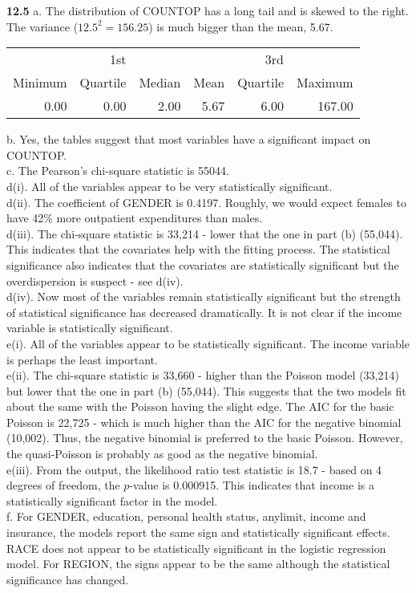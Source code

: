 \textbf{12.5} a. The distribution of COUNTOP has a long tail and is
skewed to the right. The variance ($12.5^2 = 156.25$) is much bigger
than the mean, 5.67.\\
\begin{center}\begin{tabular}{rrrrrr} \hline
   &1st &  &  &3rd  &  \\
  Minimum & Quartile & Median &   Mean &Quartile &  Maximum\\\hline
   0.00   & 0.00 &   2.00 &   5.67 &   6.00 & 167.00\\
\hline
\end{tabular}\end{center}
b. Yes, the tables suggest that most variables have a significant
impact on COUNTOP. \\
c. The Pearson's chi-square statistic is 55044. \\
d(i). All of the variables appear to be very statistically
significant. \\
d(ii). The coefficient of GENDER is  0.4197. Roughly, we would
expect females to have 42\% more outpatient expenditures than males.
\\
d(iii). The chi-square statistic is 33,214 - lower that the one in
part (b) (55,044). This indicates that the covariates help with the
fitting process. The statistical significance also indicates that
the covariates are statistically significant but the overdispersion
is suspect - see d(iv). \\
d(iv). Now most of the variables remain statistically significant
but the strength of statistical significance has decreased
dramatically. It is not clear if the income variable is
statistically significant. \\
e(i). All of the variables appear to be statistically significant.
The income variable is perhaps the least important. \\
e(ii). The chi-square statistic is 33,660 - higher than the Poisson
model (33,214) but lower that the one in part (b) (55,044). This
suggests that the two models fit about the same with the Poisson
having the slight edge. The AIC for the basic Poisson is 22,725 -
which is much higher than the AIC for the negative binomial
(10,002). Thus, the negative binomial is preferred to the basic
Poisson. However, the quasi-Poisson is probably as good as the
negative binomial. \\
e(iii). From the output, the likelihood ratio test statistic is 18.7
- based on 4 degrees of freedom, the $p$-value is 0.000915. This
indicates that income is a statistically significant factor in the
model. \\
f. For GENDER, education, personal health status, anylimit, income
and insurance, the models report the same sign and statistically
significant effects. RACE does not appear to be statistically
significant in the logistic regression model. For REGION, the signs
appear to be the same although the statistical significance has
changed.


